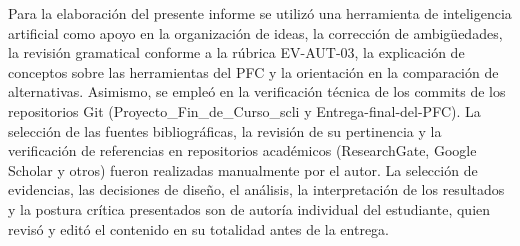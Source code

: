 \documentclass[10pt,journal,a4paper]{IEEEtran}
\begin{document}
Para la elaboración del presente informe se utilizó una herramienta de inteligencia artificial como apoyo en la organización de ideas, la corrección de ambigüedades, la revisión gramatical conforme a la rúbrica EV-AUT-03, la explicación de conceptos sobre las herramientas del PFC y la orientación en la comparación de alternativas. Asimismo, se empleó en la verificación técnica de los commits de los repositorios Git (Proyecto\_Fin\_de\_Curso\_scli y Entrega-final-del-PFC). La selección de las fuentes bibliográficas, la revisión de su pertinencia y la verificación de referencias en repositorios académicos (ResearchGate, Google Scholar y otros) fueron realizadas manualmente por el autor. La selección de evidencias, las decisiones de diseño, el análisis, la interpretación de los resultados y la postura crítica presentados son de autoría individual del estudiante, quien revisó y editó el contenido en su totalidad antes de la entrega.

\printbibliography
\end{document}
